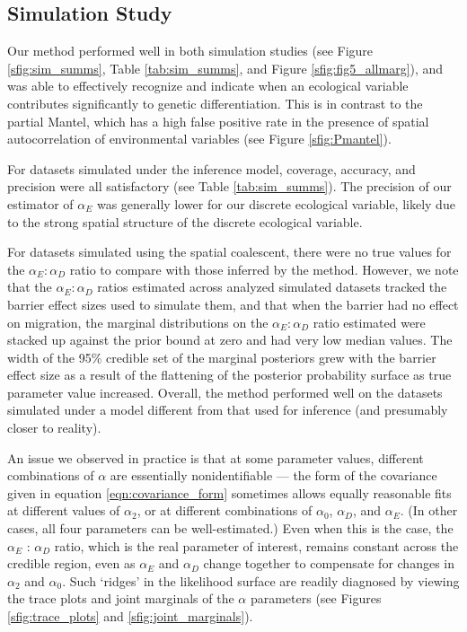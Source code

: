 \subsection*{Simulation Study}


Our method performed well in both simulation studies (see Figure \ref{sfig:sim_summs}, Table \ref{tab:sim_summs}, and Figure \ref{sfig:fig5_allmarg}), and was able to effectively recognize and indicate when an ecological variable contributes significantly to genetic differentiation.  This is in contrast to the partial Mantel, which has a high false positive rate in the presence of spatial autocorrelation of environmental variables (see Figure \ref{sfig:Pmantel}).

For datasets simulated under the inference model, coverage, accuracy, and precision were all satisfactory (see Table \ref{tab:sim_summs}). The precision of our estimator of $\alpha_E$ was generally lower for our discrete ecological variable, likely due to the strong spatial structure of the discrete ecological variable.  

For datasets simulated using the spatial coalescent, there were no true values for the $\alpha_{E}:\alpha_{D}$ ratio to compare with those inferred by the method.  However, we note that the $\alpha_{E}:\alpha_{D}$ ratios estimated across analyzed simulated datasets tracked the barrier effect sizes used to simulate them, and that when the barrier had no effect on migration, the marginal distributions on the $\alpha_{E}:\alpha_{D}$ ratio estimated were stacked up against the prior bound at zero and had very low median values.  The width of the 95\% credible set of the marginal posteriors grew with the barrier effect size as a result of the flattening of the posterior probability surface as true parameter value increased.  Overall, the method performed well on the datasets simulated under a model different from that used for inference (and presumably closer to reality).

An issue we observed in practice is that at some parameter values, different combinations of $\alpha$ are essentially nonidentifiable --- the form of the covariance given in equation \eqref{eqn:covariance_form} sometimes allows equally reasonable fits at different values of $\alpha_2$, or at different combinations of $\alpha_0$, $\alpha_{D}$, and $\alpha_{E}$.  
(In other cases, all four parameters can be well-estimated.)
Even when this is the case, the $\alpha_E$ : $\alpha_D$ ratio, which is the real parameter of interest,
remains constant across the credible region, even as $\alpha_E$ and $\alpha_D$ change together to compensate for changes in $\alpha_2$ and $\alpha_0$.
Such `ridges' in the likelihood surface are readily diagnosed by viewing the trace plots and joint marginals of the $\alpha$ parameters (see Figures \ref{sfig:trace_plots} and \ref{sfig:joint_marginals}).

